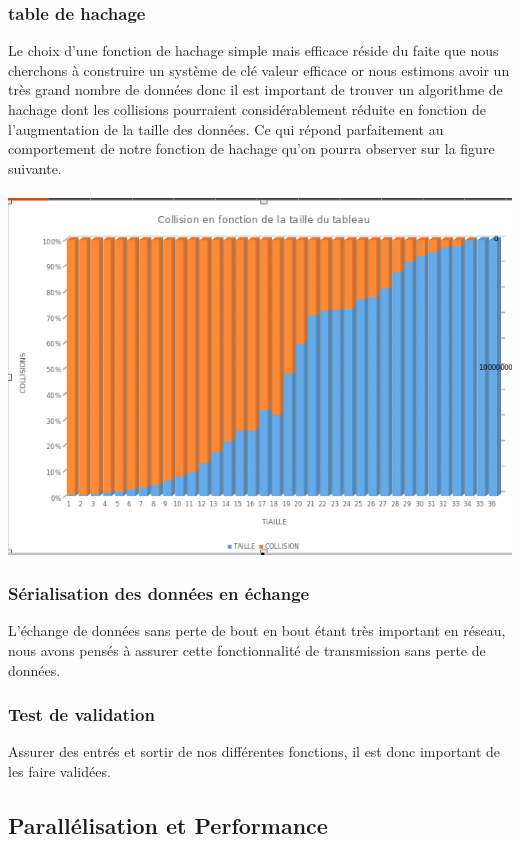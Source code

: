 \documentclass[12pt,a4paper]{article}
\begin{document}
\subsubsection{table de hachage}
\quad Le choix d'une fonction de hachage simple mais efficace réside du faite que nous cherchons à construire un système de clé valeur efficace or nous estimons avoir un très grand nombre de données donc il est important de trouver un algorithme de hachage dont les collisions pourraient considérablement réduite en fonction de l'augmentation de la taille des données. Ce qui répond parfaitement au comportement de notre fonction de hachage qu'on pourra observer sur la figure suivante.\\\\
\includegraphics[scale = 0.5]{figures/collision.png}\\
\subsubsection{Sérialisation des données en échange}
\qaud L'échange de données sans perte de bout en bout étant très important en réseau, nous avons pensés à assurer cette fonctionnalité de transmission sans perte de données.
\subsubsection{Test de validation}
\qaud Assurer des entrés et sortir de nos différentes fonctions, il est donc important de les faire validées.
\subsection{Parallélisation et Performance}
\end{document}

